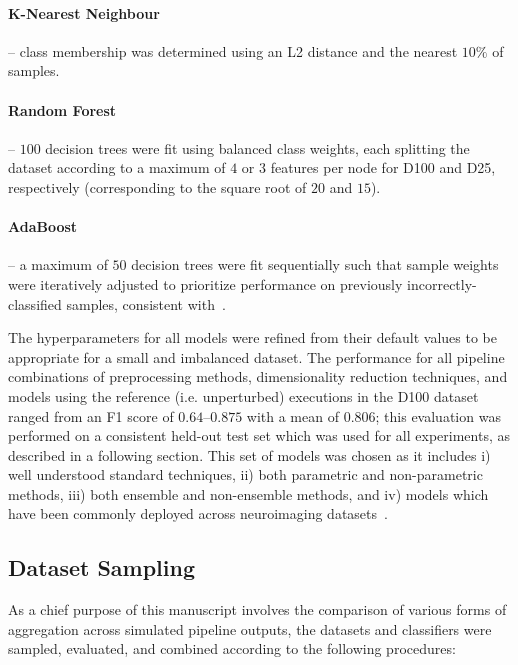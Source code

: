 \documentclass[10pt]{SelfArx} %
\begin{document}
\paragraph{K-Nearest Neighbour} – class membership was determined using an L2 distance and the nearest $10\%$ of
samples.

\paragraph{Random Forest} – $100$ decision trees were fit using balanced class weights, each splitting the dataset
according to a maximum of $4$ or $3$ features per node for D100 and D25, respectively (corresponding to the square root
of $20$ and $15$).

\paragraph{AdaBoost} – a maximum of $50$ decision trees were fit sequentially such that sample weights were iteratively
adjusted to prioritize performance on previously incorrectly-classified samples, consistent with~\cite{Freund1997-qy}.

The hyperparameters for all models were refined from their default values to be appropriate for a small and imbalanced
dataset. The performance for all pipeline combinations of preprocessing methods, dimensionality reduction techniques,
and models using the reference (i.e. unperturbed) executions in the D100 dataset ranged from an F1 score of
$0.64 – 0.875$ with a mean of $0.806$; this evaluation was performed on a consistent held-out test set which was used
for all experiments, as described in a following section. This set of models was chosen as it includes i) well
understood standard techniques, ii) both parametric and non-parametric methods, iii) both ensemble and non-ensemble
methods, and iv) models which have been commonly deployed across neuroimaging datasets~\cite{Meier2012-ve,Tunc2016-cz,
Zhu2018-cs,Payabvash2019-tm,Crossley2014-tg,Park2015-uj,Nayak2016-wl,Tolan2018-nq}.

\subsection*{Dataset Sampling}

As a chief purpose of this manuscript involves the comparison of various forms of aggregation across simulated pipeline
outputs, the datasets and classifiers were sampled, evaluated, and combined according to the following procedures:
\end{document}
